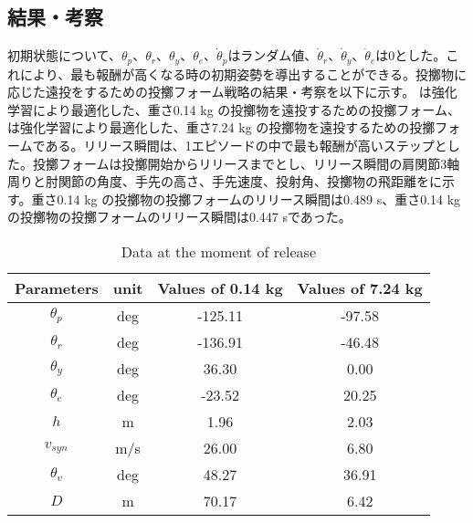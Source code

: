 
\subsection{結果・考察}
初期状態について、$\theta_{p}$、$\theta_{r}$、$\theta_{y}$、$\theta_{e}$、$\dot{\theta}_{p}$はランダム値、$\dot{\theta}_{r}$、$\dot{\theta}_{y}$、$\dot{\theta}_{e}$は0とした。これにより、最も報酬が高くなる時の初期姿勢を導出することができる。投擲物に応じた遠投をするための投擲フォーム戦略の結果・考察を以下に示す。
は強化学習により最適化した、重さ0.14 kg の投擲物を遠投するための投擲フォーム、は強化学習により最適化した、重さ7.24 kg の投擲物を遠投するための投擲フォームである。リリース瞬間は、1エピソードの中で最も報酬が高いステップとした。投擲フォームは投擲開始からリリースまでとし、リリース瞬間の肩関節3軸周りと肘関節の角度、手先の高さ、手先速度、投射角、投擲物の飛距離をに示す。重さ0.14 kg の投擲物の投擲フォームのリリース瞬間は0.489 s、重さ0.14 kg の投擲物の投擲フォームのリリース瞬間は0.447 sであった。

\begin{table}[tb]
  \begin{center}
    \caption{Data at the moment of release}

    \begin{tabular}{c c c c}
      \hline
      Parameters & unit & Values of 0.14 kg & Values of 7.24 kg \\
      \hline
      $\theta_{p}$ & deg & -125.11 & -97.58 \\
      $\theta_{r}$ & deg & -136.91 & -46.48 \\
      $\theta_{y}$ & deg  & 36.30 & 0.00 \\
      $\theta_{e}$ & deg & -23.52 & 20.25 \\
      $h$ & m & 1.96 & 2.03 \\
      $v_{syn}$ & m/s & 26.00 & 6.80 \\
      $\theta_{v}$ & deg & 48.27 & 36.91 \\
      $D$ & m & 70.17 & 6.42 \\
      \hline
    \end{tabular}
  \end{center}
\end{table}

